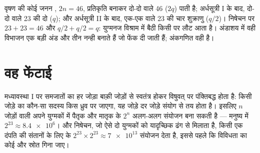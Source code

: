 \begin{example}[मानव संख्याएँ]\label{ex:g12:meiosis-genetic-shuffling:numbers}
वृषण की कोई जनन , $2n = 46$, प्रतिकृति बनाकर दो-दो  वाले 46
 ($2q$) पाती है; अर्धसूत्री I के बाद, दो-दो  वाले 23
 की दो  ($q$); और अर्धसूत्री II के बाद, एक-एक 
वाले 23  की चार शुक्राणु  ($q/2$)। निषेचन पर $23 + 23 =
46$ और $q/2 + q/2 = q$: युग्मनज विश्राम में बैठी किसी   पर
लौट आता है। अंडाशय में वही विभाजन एक बड़ी अंड  और तीन नन्ही 
बनाते हैं जो फेंक दी जाती हैं; अंकगणित वही है।
\end{example}

\section{वह फेंटाई}

\begin{proposition}[स्वतंत्र अपव्यूहन]\label{prop:g12:meiosis-genetic-shuffling:assortment}
मध्यावस्था I पर समजातों का हर जोड़ा बाक़ी जोड़ों से स्वतंत्र होकर विषुवत् पर
पंक्तिबद्ध होता है: किसी जोड़े का कौन-सा सदस्य किस ध्रुव पर जाएगा, यह जोड़े
दर जोड़े संयोग से तय होता है। इसलिए $n$ जोड़ों वाली  अपने युग्मकों में
पैतृक और मातृक  के $2^n$ अलग-अलग संयोजन बना सकती है --- मनुष्य में
$2^{23} \approx \num{8.4e6}$। और निषेचन, जो ऐसे दो युग्मकों को यादृच्छिक ढंग
से मिलाता है, किसी एक दंपति की संतानों के लिए  के $2^{23}
\times 2^{23} \approx \num{7e13}$ संयोजन देता है, इससे पहले कि विविधता का
कोई और स्रोत गिना जाए।
\end{proposition}
\admitted


